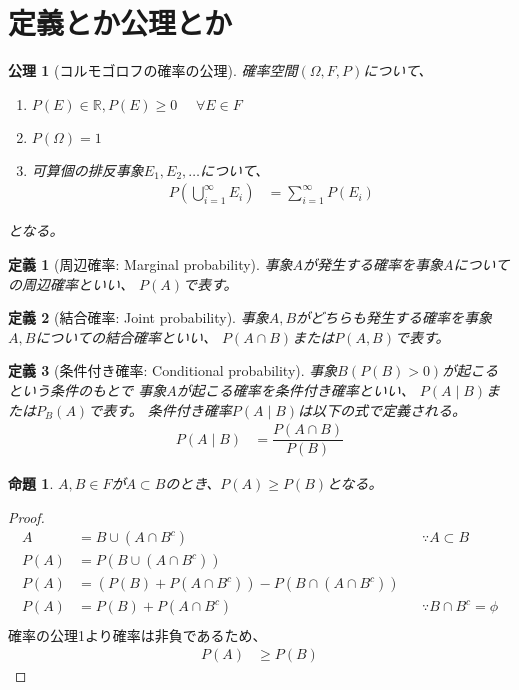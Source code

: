 \documentclass[a4j]{jsarticle}
\theoremstyle{plain}
\newtheorem{definition}{定義}[section]
\newtheorem{axiom}{公理}[section]
\newtheorem{proposition}[theorem]{命題}
\begin{document}
\section{定義とか公理とか}
\begin{axiom}[コルモゴロフの確率の公理]
  確率空間\((\Omega, F, P)\)について、
\begin{enumerate}
  \item \(P(E) \in \mathbb{R}, P(E) \geq 0 \hspace{16pt} \forall E \in F\)
  \item \(P(\Omega) = 1\)
  \item 可算個の排反事象\(E_1, E_2, \ldots\)について、
  \begin{align*}
    P\left(\bigcup_{i=1}^{\infty}E_i\right) &= \sum_{i=1}^{\infty}P(E_i)
  \end{align*}
\end{enumerate}
  となる。
\end{axiom}

\begin{definition}[周辺確率: Marginal probability]
  \label{def:marginal_p}
  事象\(A\)が発生する確率を事象\(A\)についての周辺確率といい、
  \(P(A)\)で表す。
\end{definition}
\begin{definition}[結合確率: Joint probability]
  \label{def:joint_p}
  事象\(A, B\)がどちらも発生する確率を事象\(A, B\)についての結合確率といい、
  \(P(A \cap B)\)または\(P(A, B)\)で表す。
\end{definition}
\begin{definition}[条件付き確率: Conditional probability]
  \label{def:conditional_p}
  事象\(B (P(B) > 0) \)が起こるという条件のもとで
  事象\(A\)が起こる確率を条件付き確率といい、
  \(P(A \mid B)\)または\(P_B(A)\)で表す。
  条件付き確率\(P(A \mid B)\)は以下の式で定義される。
\begin{align*}
  P(A \mid B) &= \dfrac{P(A \cap B)}{P(B)}
\end{align*}
\end{definition}

\begin{proposition}
  \(A, B \in F\)が\(A \subset B\)のとき、\(P(A) \geq P(B)\)となる。
\end{proposition}
\begin{proof}
\begin{align*}
  A &= B \cup (A \cap B^c)
  && \because A \subset B \\
  P(A) &= P(B \cup (A \cap B^c)) \\
  P(A) &= (P(B) + P(A \cap B^c)) - P(B \cap (A \cap B^c)) \\
  P(A) &= P(B) + P(A \cap B^c)
  && \because B \cap B^c = \phi \\
\end{align*}
確率の公理1より確率は非負であるため、
\begin{align*}
  P(A) &\geq P(B)
\end{align*}
\end{proof}
\end{document}
